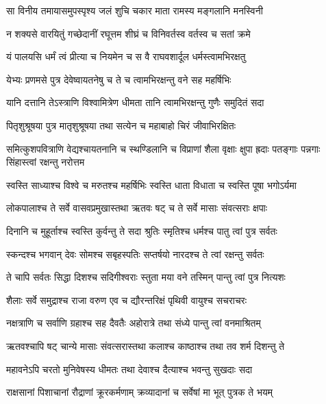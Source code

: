 
\twolineshloka
{सा विनीय तमायासमुपस्पृश्य जलं शुचि}
{चकार माता रामस्य मङ्गलानि मनस्विनी} %

\twolineshloka
{न शक्यसे वारयितुं गच्छेदानीं रघूत्तम}
{शीघ्रं च विनिवर्तस्व वर्तस्व च सतां क्रमे} %

\twolineshloka
{यं पालयसि धर्मं त्वं प्रीत्या च नियमेन च}
{स वै राघवशार्दूल धर्मस्त्वामभिरक्षतु} %

\twolineshloka
{येभ्यः प्रणमसे पुत्र देवेष्वायतनेषु च}
{ते च त्वामभिरक्षन्तु वने सह महर्षिभिः} %

\twolineshloka
{यानि दत्तानि तेऽस्त्राणि विश्वामित्रेण धीमता}
{तानि त्वामभिरक्षन्तु गुणैः समुदितं सदा} %

\twolineshloka
{पितृशुश्रूषया पुत्र मातृशुश्रूषया तथा}
{सत्येन च महाबाहो चिरं जीवाभिरक्षितः} %

\threelineshloka
{समित्कुशपवित्राणि वेद्यश्चायतनानि च}
{स्थण्डिलानि च विप्राणां शैला वृक्षाः क्षुपा ह्रदाः}
{पतङ्गाः पन्नगाः सिंहास्त्वां रक्षन्तु नरोत्तम} %

\twolineshloka
{स्वस्ति साध्याश्च विश्वे च मरुतश्च महर्षिभिः}
{स्वस्ति धाता विधाता च स्वस्ति पूषा भगोऽर्यमा} %

\twolineshloka
{लोकपालाश्च ते सर्वे वासवप्रमुखास्तथा}
{ऋतवः षट् च ते सर्वे मासाः संवत्सराः क्षपाः} %

\twolineshloka
{दिनानि च मुहूर्ताश्च स्वस्ति कुर्वन्तु ते सदा}
{श्रुतिः स्मृतिश्च धर्मश्च पातु त्वां पुत्र सर्वतः} %

\twolineshloka
{स्कन्दश्च भगवान् देवः सोमश्च सबृहस्पतिः}
{सप्तर्षयो नारदश्च ते त्वां रक्षन्तु सर्वतः} %

\twolineshloka
{ते चापि सर्वतः सिद्धा दिशश्च सदिगीश्वराः}
{स्तुता मया वने तस्मिन् पान्तु त्वां पुत्र नित्यशः} %

\twolineshloka
{शैलाः सर्वे समुद्राश्च राजा वरुण एव च}
{द्यौरन्तरिक्षं पृथिवी वायुश्च सचराचरः} %

\twolineshloka
{नक्षत्राणि च सर्वाणि ग्रहाश्च सह दैवतैः}
{अहोरात्रे तथा संध्ये पान्तु त्वां वनमाश्रितम्} %

\twolineshloka
{ऋतवश्चापि षट् चान्ये मासाः संवत्सरास्तथा}
{कलाश्च काष्ठाश्च तथा तव शर्म दिशन्तु ते} %

\twolineshloka
{महावनेऽपि चरतो मुनिवेषस्य धीमतः}
{तथा देवाश्च दैत्याश्च भवन्तु सुखदाः सदा} %

\twolineshloka
{राक्षसानां पिशाचानां रौद्राणां क्रूरकर्मणाम्}
{क्रव्यादानां च सर्वेषां मा भूत् पुत्रक ते भयम्} %

